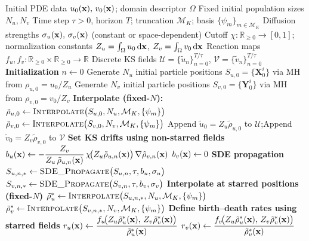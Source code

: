 \documentclass[12pt]{article}
\begin{document}
\begin{algorithm}
\caption{KS Stochastic Branching (Two-Species, Fixed-$N$ Normalization)}\label{alg:ks}
\begin{algorithmic}
\Require Initial PDE data $u_0(\mathbf{x}),\,v_0(\mathbf{x})$; domain descriptor $\Omega$
\Require Fixed initial population sizes $N_u, N_v$
\Require Time step $\tau>0$, horizon $T$; truncation $\mathcal M_K$; basis $\{\psi_m\}_{m\in\mathcal M_K}$
\Require Diffusion strengths $\sigma_u(\mathbf{x}),\,\sigma_v(\mathbf{x})$ \hfill (constant or space-dependent)
\Require Cutoff $\chi:\mathbb R_{\ge 0}\!\to[0,1]$; normalization constants $Z_u=\int_\Omega u_0\,\mathrm d\mathbf{x}$, $Z_v=\int_\Omega v_0\,\mathrm d\mathbf{x}$
\Require Reaction maps $f_u,f_v:\mathbb R_{\ge 0}\times\mathbb R_{\ge 0}\to\mathbb R$
\Ensure Discrete KS fields $\mathcal U=\{\tilde u_n\}_{n=0}^{T/\tau}$, $\mathcal V=\{\tilde v_n\}_{n=0}^{T/\tau}$
  \State \textbf{Initialization}
  \State $n\gets 0$
  \State Generate $N_u$ initial particle positions $S_{u,0}=\{\mathbf X^i_0\}$ via MH from $\rho_{u,0}=u_0/Z_u$
  \State Generate $N_v$ initial particle positions $S_{v,0}=\{\mathbf Y^i_0\}$ via MH from $\rho_{v,0}=v_0/Z_v$
  \State \textbf{Interpolate (fixed-$N$):}
  \State $\tilde\rho_{u,0} \gets \textsc{Interpolate}\big(S_{u,0},N_u,\mathcal M_K,\{\psi_m\}\big)$
  \State $\tilde\rho_{v,0} \gets \textsc{Interpolate}\big(S_{v,0},N_v,\mathcal M_K,\{\psi_m\}\big)$
  \State Append $\tilde u_0 = Z_u \tilde\rho_{u,0}$ to $\mathcal U$;\quad Append $\tilde v_0 = Z_v \tilde\rho_{v,0}$ to $\mathcal V$
    \State \textbf{Set KS drifts using non-starred fields}
    \State $b_u(\mathbf{x}) \gets -\dfrac{Z_v}{Z_u\,\tilde\rho_{u,n}(\mathbf{x})}\,\chi\!\big(Z_u\tilde\rho_{u,n}(\mathbf{x})\big)\,\nabla\tilde\rho_{v,n}(\mathbf{x})$
    \State $b_v(\mathbf{x}) \gets 0$
    \State \textbf{SDE propagation}
    \State $S_{u,n,*} \gets \textsc{SDE\_Propagate}\big(S_{u,n},\tau,b_u,\sigma_u\big)$
    \State $S_{v,n,*} \gets \textsc{SDE\_Propagate}\big(S_{v,n},\tau,b_v,\sigma_v\big)$
    \State \textbf{Interpolate at starred positions (fixed-$N$)}
    \State $\tilde\rho_u^* \gets \textsc{Interpolate}\big(S_{u,n,*},N_u,\mathcal M_K,\{\psi_m\}\big)$
    \State $\tilde\rho_v^* \gets \textsc{Interpolate}\big(S_{v,n,*},N_v,\mathcal M_K,\{\psi_m\}\big)$
    \State \textbf{Define birth--death rates using starred fields}
    \State $r_u(\mathbf{x}) \gets \dfrac{f_u\!\big(Z_u\tilde\rho_u^*(\mathbf{x}),\,Z_v\tilde\rho_v^*(\mathbf{x})\big)}{\tilde\rho_u^*(\mathbf{x})}$
    \State $r_v(\mathbf{x}) \gets \dfrac{f_v\!\big(Z_u\tilde\rho_u^*(\mathbf{x}),\,Z_v\tilde\rho_v^*(\mathbf{x})\big)}{\tilde\rho_v^*(\mathbf{x})}$

\end{algorithmic}
\end{algorithm}
\end{document}
